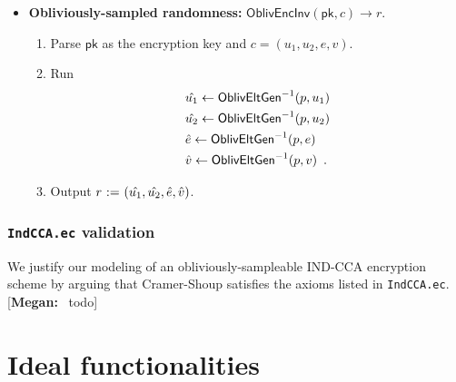 \documentclass[11pt,letterpaper]{article}
\newcommand{\doclearpage}{%
  \iffull\clearpage\else\fi
}
\newcommand{\authnote}[2]{[{\color{red}\textbf{#1:}}~{\color{blue} #2}]}
\newcommand{\authnote}[2]{}
\newcommand{\megan}[1]{\authnote{Megan}{#1}}
\theoremstyle{plain} %
\theoremstyle{definition} %
\theoremstyle{remark} %
\newcommand{\code}[1]{\texttt{#1}} %
\newcommand{\eqdef}{\ {:=} \ }
\newcommand{\OblivEncInv}{\mathsf{OblivEncInv}}
\newcommand{\EncKey}{\mathsf{pk}}
\newcommand{\Ciphertext}{c}
\newcommand{\Rand}{r}
\newcommand{\GrpEltE}{e}
\newcommand{\GrpEltU}{u}
\newcommand{\GrpEltV}{v}
\begin{document}
\begin{itemize}[nolistsep]
    \item \textbf{Obliviously-sampled randomness:} $\OblivEncInv(\EncKey, \Ciphertext) \to \Rand$.
    \begin{enumerate}[nolistsep]
        \item Parse $\EncKey$ as the encryption key and $\Ciphertext = (\GrpEltU_1,\GrpEltU_2,\GrpEltE,\GrpEltV)$.
        \item Run
        \begin{align*}
            &\Inv{\GrpEltU_1} \gets \OblivEltInv(\MultGrpOrd,\GrpEltU_1)\\
            &\Inv{\GrpEltU_2} \gets \OblivEltInv(\MultGrpOrd,\GrpEltU_2)\\
            &\Inv{\GrpEltE} \gets \OblivEltInv(\MultGrpOrd,\GrpEltE)\\
            &\Inv{\GrpEltV} \gets \OblivEltInv(\MultGrpOrd,\GrpEltV)
            \enspace.
        \end{align*}
        \item Output $\Rand \eqdef (\Inv{\GrpEltU_1}, \Inv{\GrpEltU_2}, \Inv{\GrpEltE}, \Inv{\GrpEltV})$.
    \end{enumerate}
\end{itemize}

\subsubsection{\code{IndCCA.ec} validation}
\label{sec:indcca-model-validation}

We justify our modeling of an obliviously-sampleable IND-CCA encryption scheme by arguing that Cramer-Shoup satisfies the axioms listed in \code{IndCCA.ec}.
\megan{todo}
\doclearpage
\section{Ideal functionalities}
\label{sec:ideal-functionalities}

\end{document}

